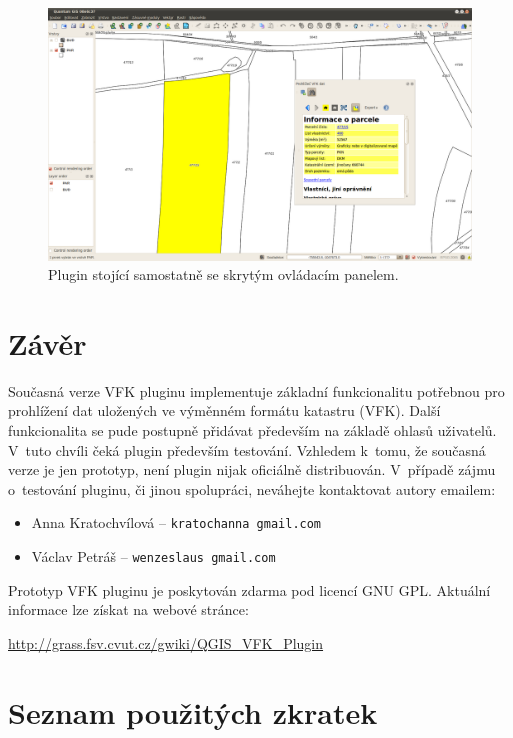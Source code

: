 \documentclass[a4paper,12pt]{article}
\begin{document}
\begin{figure}[h!]
\centering
\includegraphics[width=\textwidth]{./screenshoty/Quantum_GIS_08e6c37_039.png}
\caption{Plugin stojící samostatně se skrytým ovládacím panelem.}
\label{fig:screenshot3}
\end{figure}
\clearpage
\section{Závěr}
Současná verze VFK pluginu implementuje základní funkcionalitu potřebnou pro prohlížení dat uložených ve výměnném formátu katastru (VFK).
Další funkcionalita se pude postupně přidávat především na základě ohlasů uživatelů.
V~tuto chvíli čeká plugin především testování.
Vzhledem k~tomu, že současná verze je jen prototyp, není plugin nijak oficiálně distribuován.
V~případě zájmu o~testování pluginu, či jinou spolupráci, neváhejte kontaktovat autory emailem:
    \begin{itemize}
    \item Anna Kratochvílová -- \verb|kratochanna gmail.com|
    \item Václav Petráš -- \verb|wenzeslaus gmail.com|
    \end{itemize}
Prototyp VFK pluginu je poskytován zdarma pod licencí GNU GPL.
Aktuální informace lze získat na webové stránce:
\begin{center}\url{http://grass.fsv.cvut.cz/gwiki/QGIS_VFK_Plugin}\end{center}

\newpage
\section*{Seznam použitých zkratek}
\end{document}
